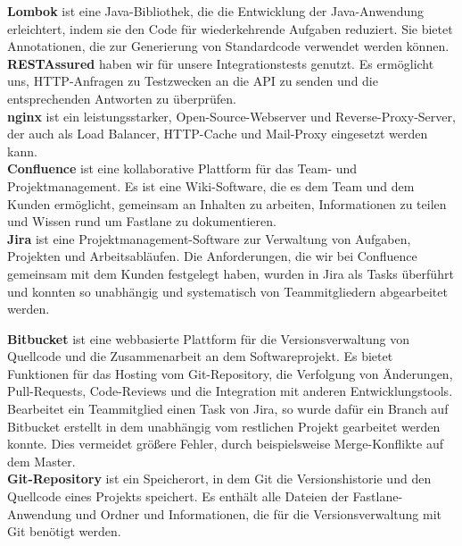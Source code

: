 \textbf{Lombok} ist eine Java-Bibliothek, die die Entwicklung der Java-Anwendung erleichtert, indem sie den Code für wiederkehrende Aufgaben reduziert.
Sie bietet Annotationen, die zur Generierung von Standardcode verwendet werden können. \\

\textbf{RESTAssured} haben wir für unsere Integrationstests genutzt.
Es ermöglicht uns, HTTP-Anfragen zu Testzwecken an die API zu senden und die entsprechenden Antworten zu überprüfen.\\

\textbf{nginx} ist ein leistungsstarker, Open-Source-Webserver und Reverse-Proxy-Server, der auch als Load Balancer, HTTP-Cache und Mail-Proxy eingesetzt werden kann.\\

\textbf{Confluence} ist eine kollaborative Plattform für das Team- und Projektmanagement.
Es ist eine Wiki-Software, die es dem Team und dem Kunden ermöglicht, gemeinsam an Inhalten zu arbeiten, Informationen zu teilen und Wissen rund um Fastlane zu dokumentieren.\\

\textbf{Jira} ist eine Projektmanagement-Software zur Verwaltung von Aufgaben, Projekten und Arbeitsabläufen.
Die Anforderungen, die wir bei Confluence gemeinsam mit dem Kunden festgelegt haben, wurden in Jira als Tasks überführt und konnten so unabhängig und systematisch von Teammitgliedern abgearbeitet werden.\\

\newpage

\textbf{Bitbucket} ist eine webbasierte Plattform für die Versionsverwaltung von Quellcode und die Zusammenarbeit an dem Softwareprojekt.
Es bietet Funktionen für das Hosting vom Git-Repository, die Verfolgung von Änderungen, Pull-Requests, Code-Reviews und die Integration mit anderen Entwicklungstools.
Bearbeitet ein Teammitglied einen Task von Jira, so wurde dafür ein Branch auf Bitbucket erstellt in dem unabhängig vom restlichen Projekt gearbeitet werden konnte.
Dies vermeidet größere Fehler, durch beispielsweise Merge-Konflikte auf dem Master.\\

\textbf{Git-Repository} ist ein Speicherort, in dem Git die Versionshistorie und den Quellcode eines Projekts speichert.
Es enthält alle Dateien der Fastlane-Anwendung und Ordner und Informationen, die für die Versionsverwaltung mit Git benötigt werden.\\

